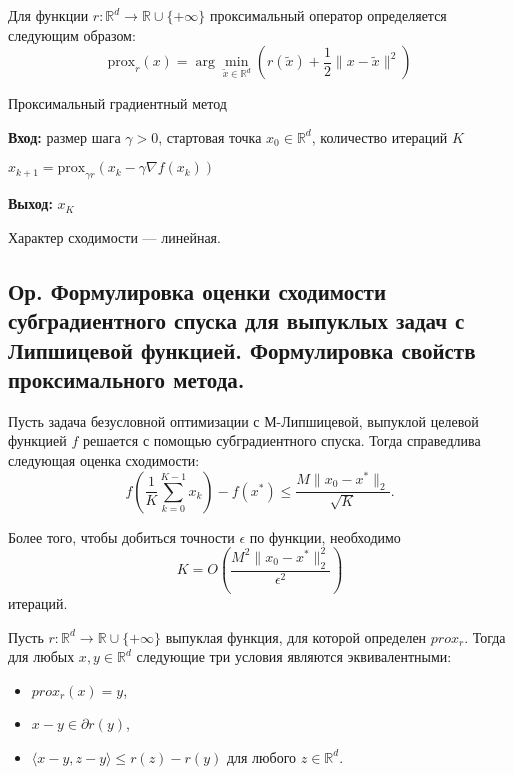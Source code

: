 \begin{definition}
    Для функции \( r : \mathbb{R}^d \to \mathbb{R} \cup \{+\infty\} \) проксимальный оператор определяется следующим образом:
    $$\text{prox}_r(x) = \arg \min_{\tilde{x} \in \mathbb{R}^d} \left( r(\tilde{x}) + \frac{1}{2} \|x - \tilde{x}\|^2 \right)$$
\end{definition}

\begin{algorithm}[H]
    \caption{Проксимальный градиентный метод}
    \textbf{Вход:} размер шага $\gamma > 0$, стартовая точка $x_0 \in \mathbb{R}^d$, количество итераций $K$
    \begin{algorithmic}[1]
        \State $x_{k+1} = \text{prox}_{\gamma r}(x_k - \gamma \nabla f(x_k))$
        \EndFor
    \end{algorithmic}
    \textbf{Выход:} $x_K$
\end{algorithm}

Характер сходимости --- линейная.

\subsection{Ор. Формулировка оценки сходимости субградиентного спуска для выпуклых задач с Липшицевой функцией.
    Формулировка свойств проксимального метода.}

\begin{theorem}
    Пусть задача безусловной оптимизации с М-Липшицевой, выпуклой целевой функцией $f$ решается с помощью субградиентного спуска. Тогда справедлива следующая оценка сходимости:
    $$ f\left( \frac{1}{K} \sum_{k=0}^{K-1} x_k \right) - f(x^*) \leq \frac{M \|x_0 - x^*\|_2}{\sqrt{K}}. $$

    Более того, чтобы добиться точности $\epsilon$ по функции, необходимо
    $$ K = O\left( \frac{M^2 \|x_0 - x^*\|_2^2}{\epsilon^2} \right) $$ итераций.
\end{theorem}

\begin{theorem}
    Пусть $r: \mathbb{R}^d \to \mathbb{R} \cup \{+\infty\}$ выпуклая функция, для которой определен $prox_r$.
    Тогда для любых $x, y \in \mathbb{R}^d$ следующие три условия являются эквивалентными:
    \begin{itemize}
        \item $prox_r(x) = y$,
        \item $x - y \in \partial r(y)$,
        \item $\langle x - y, z - y \rangle \leq r(z) - r(y)$ для любого $z \in \mathbb{R}^d$.
    \end{itemize}
\end{theorem}

